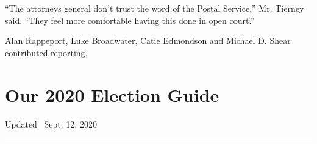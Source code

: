 ``The attorneys general don't trust the word of the Postal Service,''
Mr. Tierney said. ``They feel more comfortable having this done in open
court.''

Alan Rappeport, Luke Broadwater, Catie Edmondson and Michael D. Shear
contributed reporting.

\hypertarget{our-2020-election-guide}{%
\section{Our 2020 Election Guide}\label{our-2020-election-guide}}

Updated ~Sept. 12, 2020

\begin{center}\rule{0.5\linewidth}{\linethickness}\end{center}

